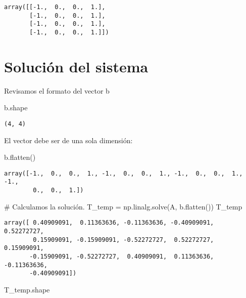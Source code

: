 \documentclass[
  letterpaper,
  DIV=11,
  numbers=noendperiod]{scrreprt}
\newenvironment{Shaded}{\begin{snugshade}}{\end{snugshade}}
\newcommand{\CommentTok}[1]{\textcolor[rgb]{0.37,0.37,0.37}{#1}}
\newcommand{\NormalTok}[1]{\textcolor[rgb]{0.00,0.23,0.31}{#1}}
\newcommand{\OperatorTok}[1]{\textcolor[rgb]{0.37,0.37,0.37}{#1}}
\begin{document}
\begin{verbatim}
array([[-1.,  0.,  0.,  1.],
       [-1.,  0.,  0.,  1.],
       [-1.,  0.,  0.,  1.],
       [-1.,  0.,  0.,  1.]])
\end{verbatim}

\section{Solución del sistema}\label{soluciuxf3n-del-sistema}

Revisamos el formato del vector b

\begin{Shaded}
\begin{Highlighting}[]
\NormalTok{b.shape}
\end{Highlighting}
\end{Shaded}

\begin{verbatim}
(4, 4)
\end{verbatim}

El vector debe ser de una sola dimensión:

\begin{Shaded}
\begin{Highlighting}[]
\NormalTok{b.flatten()}
\end{Highlighting}
\end{Shaded}

\begin{verbatim}
array([-1.,  0.,  0.,  1., -1.,  0.,  0.,  1., -1.,  0.,  0.,  1., -1.,
        0.,  0.,  1.])
\end{verbatim}

\begin{Shaded}
\begin{Highlighting}[]
\CommentTok{\# Calculamos la solución.}
\NormalTok{T\_temp }\OperatorTok{=}\NormalTok{ np.linalg.solve(A, b.flatten())}
\NormalTok{T\_temp}
\end{Highlighting}
\end{Shaded}

\begin{verbatim}
array([ 0.40909091,  0.11363636, -0.11363636, -0.40909091,  0.52272727,
        0.15909091, -0.15909091, -0.52272727,  0.52272727,  0.15909091,
       -0.15909091, -0.52272727,  0.40909091,  0.11363636, -0.11363636,
       -0.40909091])
\end{verbatim}

\begin{Shaded}
\begin{Highlighting}[]
\NormalTok{T\_temp.shape}
\end{Highlighting}
\end{Shaded}
\end{document}

